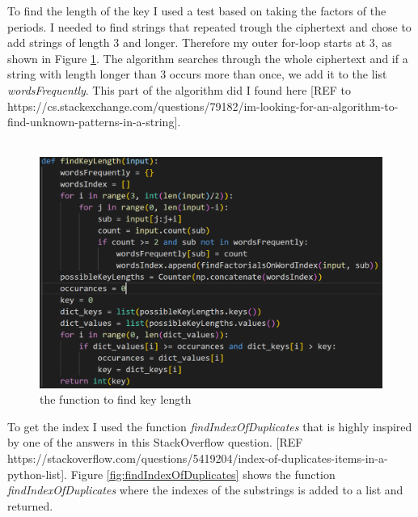 \documentclass[12pt, letterpaper]{article}
\begin{document}
To find the length of the key I used a test based on taking the factors of the periods. I needed to find strings that repeated trough the ciphertext and chose to add strings of length 3 and longer. Therefore my outer for-loop starts at 3, as shown in Figure \ref{fig:findKeyLength}. The algorithm searches through the whole ciphertext and if a string with length longer than 3 occurs more than once, we add it to the list \textit{wordsFrequently}. This part of the algorithm did I found here [REF to https://cs.stackexchange.com/questions/79182/im-looking-for-an-algorithm-to-find-unknown-patterns-in-a-string].
\\ \\
\begin{figure}[H]
  \includegraphics[width=\linewidth]{code_snippets/findKeyLength.PNG}
  \caption{the function to find key length}
  \label{fig:findKeyLength}
\end{figure}

To get the index I used the function \textit{findIndexOfDuplicates} that is highly inspired by one of the answers in this StackOverflow question. [REF https://stackoverflow.com/questions/5419204/index-of-duplicates-items-in-a-python-list]. Figure \ref{fig:findIndexOfDuplicates} shows the function \textit{findIndexOfDuplicates} where the indexes of the substrings is added to a list and returned. \\ \\
\end{document}
